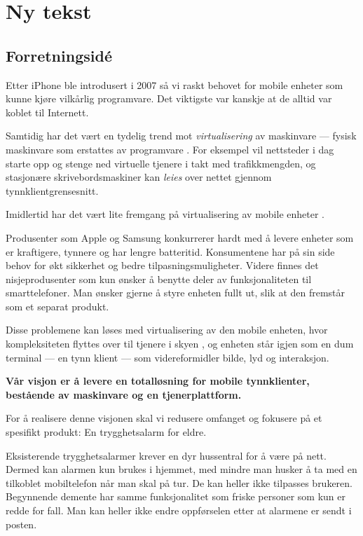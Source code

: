 \chapter{Ny tekst}

\section{Forretningsidé}

Etter iPhone ble introdusert i 2007 så vi raskt behovet for mobile enheter som
kunne kjøre vilkårlig programvare. Det viktigste var kanskje at de alltid var
koblet til Internett.

Samtidig har det vært en tydelig trend mot \textit{virtualisering} av
maskinvare --- fysisk maskinvare som erstattes av programvare
\cite{2006.virtualization.trends}.  For eksempel vil nettsteder i dag starte
opp og stenge ned virtuelle tjenere i takt med trafikkmengden, og stasjonære
skrivebordsmaskiner kan \textit{leies} over nettet gjennom
tynnklientgrensesnitt.

Imidlertid har det vært lite fremgang på virtualisering av mobile enheter
\cite{embedded.virtualization}.

Produsenter som Apple og Samsung konkurrerer hardt med å levere enheter som er
kraftigere, tynnere og har lengre batteritid.
%
Konsumentene har på sin side behov for økt sikkerhet og bedre
tilpasningsmuligheter.
%
Videre finnes det nisjeprodusenter som kun ønsker å benytte deler av
funksjonaliteten til smarttelefoner.
%
Man ønsker gjerne å styre enheten fullt ut, slik at den fremstår som et separat
produkt.

Disse problemene kan løses med virtualisering av den mobile enheten, hvor
kompleksiteten flyttes over til tjenere i skyen \cite{mobil.virt.fordel}, og
enheten står igjen som en dum terminal --- en tynn klient --- som
videreformidler bilde, lyd og interaksjon.

\textbf{Vår visjon er å levere en totalløsning for mobile tynnklienter,
bestående av maskinvare og en tjenerplattform.}

For å realisere denne visjonen skal vi redusere omfanget og fokusere på et
spesifikt produkt: En trygghetsalarm for eldre.

Eksisterende trygghetsalarmer krever en dyr hussentral for å være på nett.
Dermed kan alarmen kun brukes i hjemmet, med mindre man husker å ta med en
tilkoblet mobiltelefon når man skal på tur. De kan heller ikke tilpasses
brukeren. Begynnende demente har samme funksjonalitet som friske personer som
kun er redde for fall. Man kan heller ikke endre oppførselen etter at alarmene
er sendt i posten.

